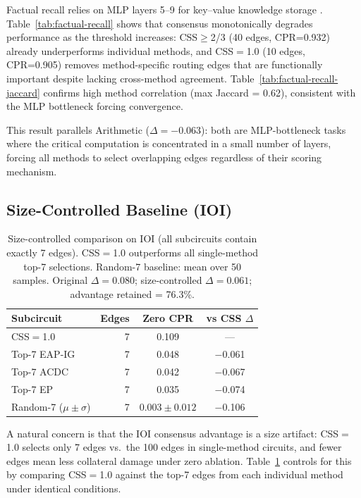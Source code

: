 \documentclass[11pt,a4paper]{article}
\newcommand{\cpr}{\textsc{CPR}}
\newcommand{\eapig}{\textsc{EAP-IG}}
\newcommand{\acdc}{\textsc{ACDC}}
\newcommand{\ep}{\textsc{EP}}
\begin{document}
Factual recall relies on MLP layers 5--9 for key--value knowledge storage \cite{meng2022locating}. Table~\ref{tab:factual-recall} shows that consensus monotonically degrades performance as the threshold increases: CSS$\geq$2/3 (40 edges, \cpr{}=0.932) already underperforms individual methods, and CSS$=$1.0 (10 edges, \cpr{}=0.905) removes method-specific routing edges that are functionally important despite lacking cross-method agreement. Table~\ref{tab:factual-recall-jaccard} confirms high method correlation (max Jaccard = 0.62), consistent with the MLP bottleneck forcing convergence.

This result parallels Arithmetic ($\Delta=-0.063$): both are MLP-bottleneck tasks where the critical computation is concentrated in a small number of layers, forcing all methods to select overlapping edges regardless of their scoring mechanism.

\subsection{Size-Controlled Baseline (IOI)}
\label{sec:size-controlled}

\begin{table}[t]
\centering
\small
\begin{tabular}{lrcc}
\toprule
\textbf{Subcircuit} & \textbf{Edges} & \textbf{Zero \cpr{}} & \textbf{vs CSS $\Delta$}\\
\midrule
CSS$=$1.0         & 7 & 0.109 & --- \\
Top-7 \eapig{}    & 7 & 0.048 & $-$0.061 \\
Top-7 \acdc{}     & 7 & 0.042 & $-$0.067 \\
Top-7 \ep{}       & 7 & 0.035 & $-$0.074 \\
Random-7 ($\mu \pm \sigma$)  & 7 & $0.003 \pm 0.012$ & $-$0.106 \\
\bottomrule
\end{tabular}
\caption{Size-controlled comparison on IOI (all subcircuits contain exactly 7 edges). CSS$=$1.0 outperforms all single-method top-7 selections. Random-7 baseline: mean over 50 samples. Original $\Delta=0.080$; size-controlled $\Delta=0.061$; advantage retained = 76.3\%.}
\label{tab:size-controlled}
\end{table}

A natural concern is that the IOI consensus advantage is a size artifact: CSS$=$1.0 selects only 7 edges vs.\ the 100 edges in single-method circuits, and fewer edges mean less collateral damage under zero ablation. Table~\ref{tab:size-controlled} controls for this by comparing CSS$=$1.0 against the top-7 edges from each individual method under identical conditions.
\end{document}
